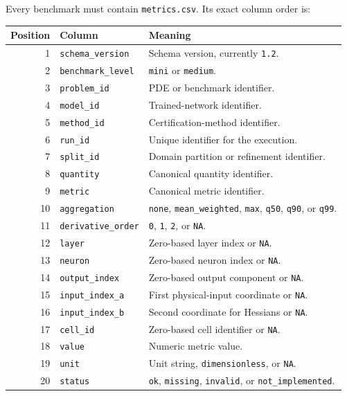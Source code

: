 \documentclass[11pt]{article}
\newcommand{\NA}{\texttt{NA}}
\begin{document}
Every benchmark must contain \texttt{metrics.csv}.  Its exact column order is:
\begin{center}
\small
\begin{tabularx}{\textwidth}{@{}r l X@{}}
\toprule
Position & Column & Meaning \\
\midrule
1 & \texttt{schema\_version} & Schema version, currently \texttt{1.2}. \\
2 & \texttt{benchmark\_level} & \texttt{mini} or \texttt{medium}. \\
3 & \texttt{problem\_id} & PDE or benchmark identifier. \\
4 & \texttt{model\_id} & Trained-network identifier. \\
5 & \texttt{method\_id} & Certification-method identifier. \\
6 & \texttt{run\_id} & Unique identifier for the execution. \\
7 & \texttt{split\_id} & Domain partition or refinement identifier. \\
8 & \texttt{quantity} & Canonical quantity identifier. \\
9 & \texttt{metric} & Canonical metric identifier. \\
10 & \texttt{aggregation} & \texttt{none}, \texttt{mean\_weighted}, \texttt{max}, \texttt{q50}, \texttt{q90}, or \texttt{q99}. \\
11 & \texttt{derivative\_order} & \texttt{0}, \texttt{1}, \texttt{2}, or \NA. \\
12 & \texttt{layer} & Zero-based layer index or \NA. \\
13 & \texttt{neuron} & Zero-based neuron index or \NA. \\
14 & \texttt{output\_index} & Zero-based output component or \NA. \\
15 & \texttt{input\_index\_a} & First physical-input coordinate or \NA. \\
16 & \texttt{input\_index\_b} & Second coordinate for Hessians or \NA. \\
17 & \texttt{cell\_id} & Zero-based cell identifier or \NA. \\
18 & \texttt{value} & Numeric metric value. \\
19 & \texttt{unit} & Unit string, \texttt{dimensionless}, or \NA. \\
20 & \texttt{status} & \texttt{ok}, \texttt{missing}, \texttt{invalid}, or \texttt{not\_implemented}. \\
\bottomrule
\end{tabularx}
\end{center}
\end{document}
